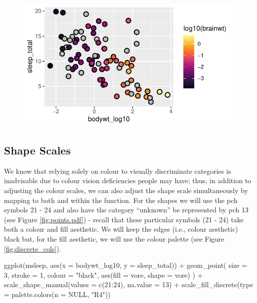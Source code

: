 \vspace{2em}

\begin{figure}[H]
\includegraphics[scale = .75]{graphics/ch2Figs/ggEx_29.pdf}
\end{figure}

\subsection{Shape Scales}

We know that relying solely on colour to visually discriminate categories is inadvisable due to colour vision deficiencies people may have; thus, in addition to adjusting the colour scales, we can also adjust the shape scale simultaneously by mapping  to both  and  within the  function. For the shapes we will use the pch symbols 21 - 24 and also have the category ``unknown'' be represented by pch 13 (see Figure \ref{fig:points.pdf}) - recall that these particular symbols (21 - 24) take both a colour and fill aesthetic. We will keep the edges (i.e., colour aesthetic) black but, for the fill aesthetic, we will use the  colour palette (see Figure \ref{fig:discrete_cols}).

\begin{inR}
ggplot(msleep, aes(x = bodywt_log10, y = sleep_total)) +
  geom_point(
    size = 3, stroke = 1, colour = "black",
    aes(fill = vore, shape = vore)
  ) +
  scale_shape_manual(values = c(21:24), na.value = 13) +
  scale_fill_discrete(type = palette.colors(n = NULL, "R4"))
\end{inR}

\vspace{2em}

